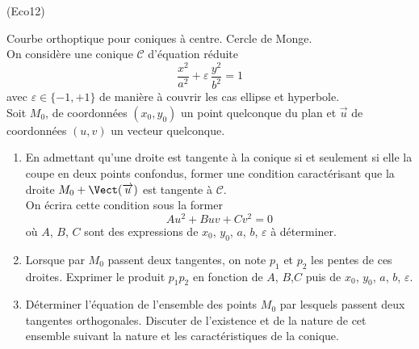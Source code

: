 \begin{tiny}(Eco12)\end{tiny} Courbe orthoptique pour coniques à centre. Cercle de Monge.\\
On considère une conique $\mathcal C$ d'équation réduite
\begin{displaymath}
 \frac{x^2}{a^2}+\varepsilon \,\frac{y^2}{b^2} = 1
\end{displaymath}
 avec $\varepsilon\in \{-1,+1\}$ de manière à couvrir les cas ellipse et hyperbole.\\
Soit $M_0$, de coordonnées $(x_0,y_0)$ un point quelconque du plan et $\overrightarrow u$ de coordonnées $(u,v)$ un vecteur quelconque.
\begin{enumerate}
 \item En admettant qu'une droite est tangente à la conique si et seulement si elle la coupe en deux points confondus, former une condition caractérisant que la droite $M_0+\Vect(\overrightarrow u)$ est tangente à $\mathcal C$.\\
On écrira cette condition sous la former
\begin{displaymath}
Au^2 + Buv + Cv^2 =0
\end{displaymath}
où $A$, $B$, $C$ sont des expressions de $x_0$, $y_0$, $a$, $b$, $\varepsilon$ à déterminer.
\item Lorsque par $M_0$ passent deux tangentes, on note $p_1$ et $p_2$ les pentes de ces droites. Exprimer le produit $p_1p_2$ en fonction de $A$, $B$,$C$ puis de $x_0$, $y_0$, $a$, $b$, $\varepsilon$.
\item Déterminer l'équation de l'ensemble des points $M_0$ par lesquels passent deux tangentes orthogonales. Discuter de l'existence et de la nature de cet ensemble suivant la nature et les caractéristiques de la conique.
\end{enumerate}
 